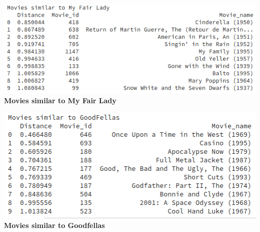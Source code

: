 \documentclass[openany,11pt]{homework}
\begin{document}
\begin{center}
	\centering
	\includegraphics[width = \textwidth]{mfl.png}
	\textbf{Movies similar to My Fair Lady}
\end{center}

\begin{center}
	\centering
	\includegraphics[width = \textwidth]{gf.png}
	\textbf{Movies similar to Goodfellas}
\end{center}
\end{document}
